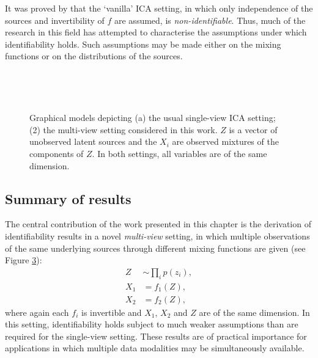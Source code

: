 It was proved by \cite{hyvarinen1999nonlinear} that the `vanilla' ICA setting, in which only independence of the sources and invertibility of $f$ are assumed, is \emph{non-identifiable}.
Thus, much of the research in this field has attempted to characterise the assumptions under which identifiability holds.
Such assumptions may be made either on the mixing functions or on the distributions of the sources. 


\begin{figure}
\center

\end{figure}

\begin{figure}
	\begin{subfigure}{.45\linewidth}
		\center\
		\caption{}\label{fig:ica-model:a}
	\end{subfigure}
	\hfill
	\begin{subfigure}{.45\linewidth}
		\center\
		\caption{}\label{fig:ica-model:b}
	\end{subfigure}
	\caption[Graphical model depictions of ICA and multi-view ICA]{Graphical models depicting (a) the usual single-view ICA setting; (2) the multi-view setting considered in this work. $Z$ is a vector of unobserved latent sources and the $X_i$ are observed mixtures of the components of $Z$. In both settings, all variables are of the same dimension.}
\end{figure}


\subsection{Summary of results}

The central contribution of the work presented in this chapter is the derivation of identifiability results in a novel \emph{multi-view} setting, in which multiple observations of the same underlying sources through different mixing functions are given (see Figure \ref{fig:ica-model:b}):
%
\begin{align*}
Z &\sim \prod_i p(z_i), \\
X_1 &= f_1(Z), \\
X_2 &= f_2(Z),
\end{align*}
%
where again each $f_i$ is invertible and $X_1$, $X_2$ and $Z$ are of the same dimension. 
In this setting, identifiability holds subject to much weaker assumptions than are required for the single-view setting.
These results are of practical importance for applications in which multiple data modalities may be simultaneously available.

